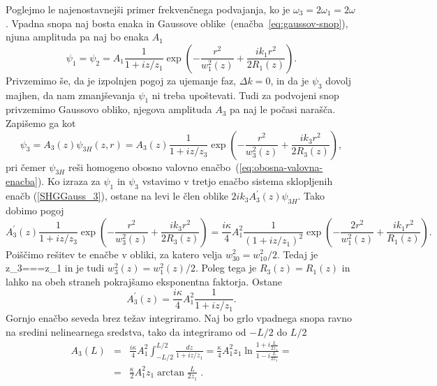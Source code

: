 Poglejmo le najenostavnejši primer frekvenčnega podvajanja, ko je 
$\omega_{3}=2\omega_{1}=2\omega$.
Vpadna snopa naj bosta enaka in Gaussove oblike~(enačba~\ref{eq:gaussov-snop}), 
njuna amplituda pa naj bo enaka $A_1$
\begin{equation}
\psi_{1} = \psi_2 = A_{1}\frac{1}{1+iz/z_1}
\exp\left(-\frac{r^{2}}{w_1^{2}(z)}+\frac{ik_1r^{2}}{2R_1(z)}\right).
\label{8.21}
\end{equation}
Privzemimo še, da je izpolnjen pogoj za ujemanje faz, $\Delta k=0$,
in da je $\psi_{3}$ dovolj majhen, da nam zmanjševanja $\psi_{1}$
ni treba upoštevati. Tudi za podvojeni snop privzemimo Gaussovo 
obliko, njegova amplituda $A_3$ pa naj le počasi narašča. Zapišemo ga kot
\begin{equation}
\psi_{3}=A_{3}(z)\psi_{3H}(z,r)=A_{3}(z)\frac{1}{1+iz/z_{3}}
\exp\left(-\frac{r^{2}}{w_{3}^{2}(z)}+\frac{ik_{3}r^{2}}{2R_{3}(z)}\right),
\label{8.22}
\end{equation}
pri čemer $\psi_{3H}$ reši homogeno obosno valovno 
enačbo~(\ref{eq:obosna-valovna-enacba}). Ko izraza za $\psi_{1}$
in $\psi_{3}$ vstavimo v tretjo enačbo sistema sklopljenih enačb (\ref{SHGGauss_3}),
ostane na levi le člen oblike $2ik_{3}A_{3}^{\prime}(z)\psi_{3H}$. Tako dobimo pogoj
\begin{equation}
A_{3}^{\prime}(z)\frac{1}{1+iz/z_3}\exp\left(-\frac{r^{2}}{w_{3}^{2}(z)}+\frac{ik_{3}r^{2}}
{2R_{3}(z)}\right)=
\frac{i\kappa}{4}A_{1}^{2}\frac{1}{(1+iz/z_{1})^{2}}\exp\left(-\frac{2r^{2}}
{w_{1}^{2}(z)}+\frac{ik_{1}r^{2}}{R_{1}(z)}\right).
\label{8.23}
\end{equation}
Poiščimo rešitev te enačbe v obliki, za katero velja $w_{30}^{2}=w_{10}^{2}/2$. Tedaj je 
\beq
z_{3}===z_{1}
\eeq
in je tudi $w_{3}^{2}(z)=w_{1}^{2}(z)/2$. Poleg tega je $R_{3}(z)=R_{1}(z)$
in lahko na obeh straneh pokrajšamo eksponentna faktorja. Ostane 
\begin{equation}
A_{3}^{\prime}(z)=\frac{i\kappa}{4}A_{1}^{2}\frac{1}{1+iz/z_1}.
\label{8.24}
\end{equation}
Gornjo enačbo seveda brez težav integriramo. Naj bo grlo vpadnega
snopa ravno na sredini nelinearnega sredstva, tako da integriramo
od $-L/2$ do $L/2$
\begin{eqnarray}
A_{3}(L) & = & \frac{i\kappa}{4}A_{1}^{2}\int_{-L/2}^{L/2}\frac{dz}{1+iz/z_1} 
  = \frac{\kappa}{4}A_{1}^{2}z_{1}\ln\frac{1+i\frac{L}{2z_{1}}}{1-i\frac{L}{2z_{1}}}= \nonumber \\
 & = & \frac{\kappa}{2}A_{1}^{2}z_{1}\arctan\frac{L}{2z_{1}}\;.
\end{eqnarray}
